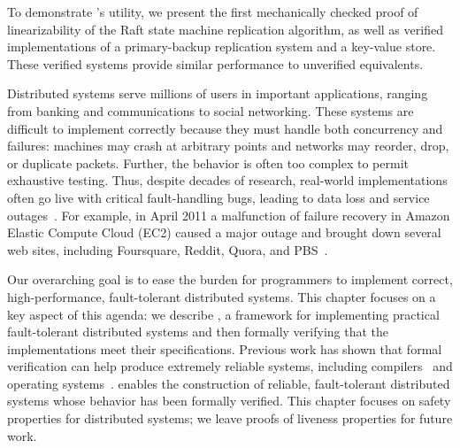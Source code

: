   To demonstrate \Verdi's utility, we present the first mechanically
  checked proof of linearizability of the Raft state machine
  replication algorithm, as well as verified implementations of a
  primary-backup replication system and a key-value store. These
  verified systems provide similar performance to unverified
  equivalents.


Distributed systems serve millions of users in important applications,
ranging from banking and communications to social networking.
%
These systems are difficult to implement correctly because they
must handle both concurrency and failures: machines may
crash at arbitrary points and networks may reorder, drop, or duplicate packets.
Further, the behavior is often too complex to permit exhaustive testing.
%
Thus, despite decades of research,
real-world implementations
often go live with critical fault-handling bugs, leading to data loss and
service outages~\cite{yuan:aspirator,guo:fail-recover}.
%
For example, in April 2011 a malfunction of failure recovery in Amazon
Elastic Compute Cloud (EC2) caused a major outage and brought down several
web sites, including \mbox{Foursquare}, \mbox{Reddit}, \mbox{Quora},
and \mbox{PBS}~\cite{amazon:apr11-outage,lohr:amazon-apr11,highscalability}.

%
%


Our overarching goal is to ease the burden for programmers to
implement correct, high-performance, fault-tolerant distributed systems.
%
This chapter focuses on a key aspect of this agenda:
we describe \Verdi, a framework
for implementing practical fault-tolerant distributed systems and then
formally verifying that the implementations meet their
specifications.
%
Previous work has shown that formal verification can help produce extremely
reliable systems, including compilers~\cite{yang:csmith} and
operating systems~\cite{klein:sel4,yang:verve}.
%
\Verdi enables the construction of reliable, fault-tolerant distributed
systems whose behavior has been formally verified.
%
This chapter focuses on safety properties for distributed systems;
we leave proofs of liveness properties for future work.


